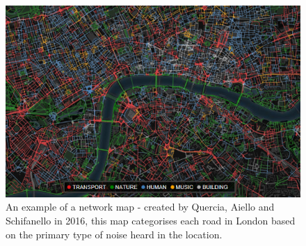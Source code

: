 \begin{figure}[H]
\centering
\includegraphics[scale=0.8]{figures/noise_network}
\decoRule
\caption{An example of a network map - created by Quercia, Aiello and Schifanello in 2016, this map categorises each road in London based on the primary type of noise heard in the location.}
\end{figure}


